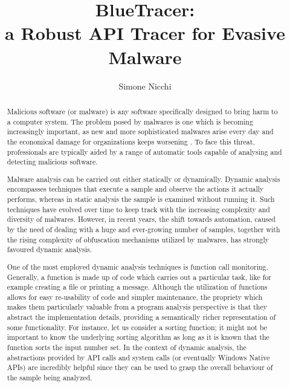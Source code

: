 \documentclass[binding=0.6cm,LaM,english,noexaminfo,oneside]{sapthesis} %
\title{BlueTracer: \\ a Robust API Tracer for Evasive Malware}
\author{Simone Nicchi}
\begin{document}
\frontmatter
\maketitle
\dedication{Ai miei genitori, che non hanno mai smesso di supportarmi}

\begingroup
\clearpage%
\let\clearpage\relax%
\vspace*{-2cm}%
\begin{abstract}

Malicious software (or malware) is any software specifically designed to bring harm to a computer system. The problem posed by malwares is one which is becoming increasingly important, as new and more sophisticated malwares arise every day and the economical damage for organizations keeps worsening \cite{Cisco}. To face this threat, professionals are typically aided by a range of automatic tools capable of analysing and detecting malicious software.

Malware analysis can be carried out either statically or dynamically. Dynamic analysis encompasses techniques that execute a sample and observe the actions it actually performs, whereas in static analysis the sample is examined without running it. Such techniques have evolved over time to keep track with the increasing complexity and diversity of malwares. However, in recent years, the shift towards automation, caused by the need of dealing with a huge and ever-growing number of samples, together with the rising complexity of obfuscation mechanisms utilized by malwares, has strongly favoured dynamic analysis.  

One of the most employed dynamic analysis techniques is function call monitoring. Generally, a function is made up of code which carries out a particular task, like for example creating a file or printing a message. Although the utilization of functions allows for easy re-usability of code and simpler maintenance, the propriety which makes them particularly valuable from a program analysis perspective is that they abstract the implementation details, providing a semantically richer representation of some functionality. For instance, let us consider a sorting function; it might not be important to know the underlying sorting algorithm as long as it is known that the function sorts the input number set. In the context of dynamic analysis, the abstractions provided by API calls and system calls (or eventually Windows Native APIs) are incredibly helpful since they can be used to grasp the overall behaviour of the sample being analyzed.


\end{abstract}
\end{document}
